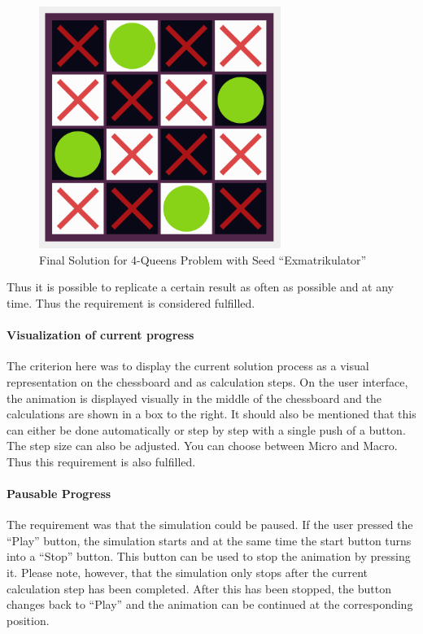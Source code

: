 \begin{figure}[H]
  \centering
  \includegraphics[width=0.7\textwidth]{img/Proof_Chessboard}
  \caption{Final Solution for 4-Queens Problem with Seed \enquote{Exmatrikulator}}
  \label{fig:design}
\end{figure}

Thus it is possible to replicate a certain result as often as possible and at any time. Thus the requirement is considered fulfilled.

\paragraph{Visualization of current progress}
The criterion here was to display the current solution process as a visual representation on the chessboard and as calculation steps. On the user interface, the animation is displayed visually in the middle of the chessboard and the calculations are shown in a box to the right. It should also be mentioned that this can either be done automatically or step by step with a single push of a button. The step size can also be adjusted. You can choose between Micro and Macro. Thus this requirement is also fulfilled.

\paragraph{Pausable Progress}
The requirement was that the simulation could be paused. If the user pressed the \enquote{Play} button, the simulation starts and at the same time the start button turns into a \enquote{Stop} button. This button can be used to stop the animation by pressing it. Please note, however, that the simulation only stops after the current calculation step has been completed. After this has been stopped, the button changes back to \enquote{Play} and the animation can be continued at the corresponding position.

